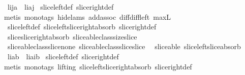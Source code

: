\begin{isabellebody}
\ \ {\isachardoublequoteopen}{\isacharparenleft}l{\isasymdagger}i{\isachardot}{\isachardot}j{\isacharparenright}{\isasymdagger}a{\isachardot}{\isachardot}\ {\isacharequal}\ l{\isasymdagger}{\isacharparenleft}i{\isacharplus}a{\isacharparenright}{\isachardot}{\isachardot}j{\isachardoublequoteclose}\isanewline
%
\isadelimproof
%
\endisadelimproof
%
\isatagproof
{}\isamarkupfalse%
\ slice{\isacharunderscore}left{\isacharunderscore}def\ slice{\isacharunderscore}right{\isacharunderscore}def\isanewline
{}\isamarkupfalse%
\ {\isacharparenleft}metis\ {\isacharparenleft}mono{\isacharunderscore}tags{\isacharcomma}\ hide{\isacharunderscore}lams{\isacharparenright}\ add{\isachardot}assoc\ diff{\isacharunderscore}diff{\isacharunderscore}left\ max{\isacharunderscore}{}L\ \isanewline
\ \ slice{\isacharunderscore}left{\isacharunderscore}def\ slice{\isacharunderscore}left{\isacharunderscore}slice{\isacharunderscore}right{\isacharunderscore}absorb\ slice{\isacharunderscore}right{\isacharunderscore}def\ \isanewline
\ \ slice{\isacharunderscore}slice{\isacharunderscore}right{\isacharunderscore}absorb\ sliceable{\isacharunderscore}class{\isachardot}size{\isacharunderscore}slice\ \isanewline
\ \ sliceable{\isacharunderscore}class{\isachardot}slice{\isacharunderscore}none\ sliceable{\isacharunderscore}class{\isachardot}slice{\isacharunderscore}slice{\isacharparenright}%
\endisatagproof
{\isafoldproof}%
%
\isadelimproof
\isanewline
%
\endisadelimproof
\isanewline
{}\isamarkupfalse%
\ {\isacharparenleft}\ sliceable{\isacharparenright}\ slice{\isacharunderscore}left{\isacharunderscore}slice{\isacharunderscore}absorb{\isacharcolon}\ \isanewline
\ \ {\isachardoublequoteopen}{\isacharparenleft}l{\isasymdagger}i{\isachardot}{\isachardot}{\isacharparenright}{\isasymdagger}a{\isachardot}{\isachardot}b\ {\isacharequal}\ l{\isasymdagger}{\isacharparenleft}i{\isacharplus}a{\isacharparenright}{\isachardot}{\isachardot}{\isacharparenleft}i{\isacharplus}b{\isacharparenright}{\isachardoublequoteclose}\isanewline
%
\isadelimproof
%
\endisadelimproof
%
\isatagproof
{}\isamarkupfalse%
\ slice{\isacharunderscore}left{\isacharunderscore}def\ slice{\isacharunderscore}right{\isacharunderscore}def\isanewline
{}\isamarkupfalse%
\ {\isacharparenleft}metis\ {\isacharparenleft}mono{\isacharunderscore}tags{\isacharcomma}\ lifting{\isacharparenright}\ slice{\isacharunderscore}left{\isacharunderscore}slice{\isacharunderscore}right{\isacharunderscore}absorb\ slice{\isacharunderscore}right{\isacharunderscore}def\ \isanewline

\end{isabellebody}
